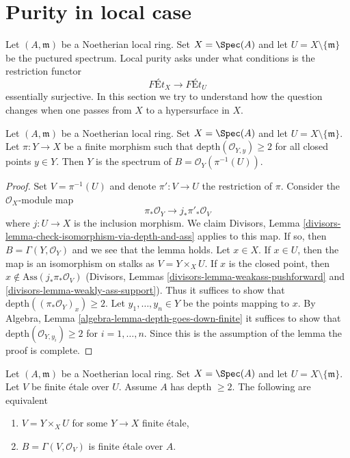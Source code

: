\section{Purity in local case}
\label{section-local-purity}

\noindent
Let $(A, \mathfrak m)$ be a Noetherian local ring. Set $X = \Spec(A)$
and let $U = X \setminus \{\mathfrak m\}$ be the puctured spectrum.
Local purity asks under what conditions is the restriction functor
$$
\textit{F\'Et}_X \longrightarrow \textit{F\'Et}_U
$$
essentially surjective. In this section we try to understand
how the question changes when one passes from $X$ to a hypersurface in $X$.

\begin{lemma}
\label{lemma-sections-over-punctured-spec}
Let $(A, \mathfrak m)$ be a Noetherian local ring. Set $X = \Spec(A)$
and let $U = X \setminus \{\mathfrak m\}$.
Let $\pi : Y \to X$ be a finite morphism such that
$\text{depth}(\mathcal{O}_{Y, y}) \geq 2$ for all closed points
$y \in Y$.
Then $Y$ is the spectrum of $B = \mathcal{O}_Y(\pi^{-1}(U))$.
\end{lemma}

\begin{proof}
Set $V = \pi^{-1}(U)$ and denote $\pi' : V \to U$ the restriction of $\pi$.
Consider the $\mathcal{O}_X$-module map
$$
\pi_*\mathcal{O}_Y \longrightarrow j_*\pi'_*\mathcal{O}_V
$$
where $j : U \to X$ is the inclusion morphism. We claim
Divisors, Lemma \ref{divisors-lemma-check-isomorphism-via-depth-and-ass}
applies to this map. If so, then $B = \Gamma(Y, \mathcal{O}_Y)$
and we see that the lemma holds. Let $x \in X$.
If $x \in U$, then the map is an
isomorphism on stalks as $V = Y \times_X U$.
If $x$ is the closed point, then
$x \not \in \text{Ass}(j_*\pi_*\mathcal{O}_V)$
(Divisors, Lemmas \ref{divisors-lemma-weakass-pushforward} and
\ref{divisors-lemma-weakly-ass-support}).
Thus it suffices to show that
$\text{depth}((\pi_*\mathcal{O}_Y)_x) \geq 2$.
Let $y_1, \ldots, y_n \in Y$ be the points mapping to $x$.
By Algebra, Lemma \ref{algebra-lemma-depth-goes-down-finite}
it suffices to show that
$\text{depth}(\mathcal{O}_{Y, y_i}) \geq 2$ for $i = 1, \ldots, n$.
Since this is the assumption of the lemma the proof is complete.
\end{proof}

\begin{lemma}
\label{lemma-reformulate-purity}
Let $(A, \mathfrak m)$ be a Noetherian local ring. Set $X = \Spec(A)$
and let $U = X \setminus \{\mathfrak m\}$.
Let $V$ be finite \'etale
over $U$. Assume $A$ has depth $\geq 2$. The following are equivalent
\begin{enumerate}
\item $V = Y \times_X U$ for some $Y \to X$ finite \'etale,
\item $B = \Gamma(V, \mathcal{O}_V)$ is finite \'etale over $A$.
\end{enumerate}
\end{lemma}

